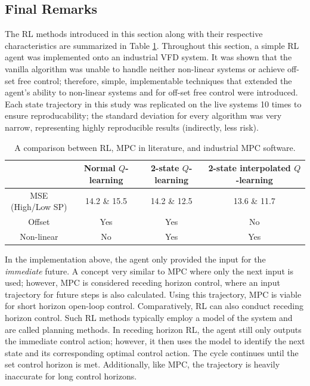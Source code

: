 \subsection{Final Remarks}
The RL methods introduced in this section along with their respective characteristics are summarized in Table \ref{tab:system1_info}. Throughout this section, a simple RL agent was implemented onto an industrial VFD system. It was shown that the vanilla algorithm was unable to handle neither non-linear systems or achieve off-set free control; therefore, simple, implementable techniques that extended the agent's ability to non-linear systems and for off-set free control were introduced. Each state trajectory in this study was replicated on the live systems 10 times to ensure reproducability; the standard deviation for every algorithm was very narrow, representing highly reproducible results (indirectly, less risk).

\begin{table}[H]
\caption{A comparison between RL, MPC in literature, and industrial MPC software.}
\label{tab:system1_info}
\centering
{\scriptsize
\begin{tabular}{c|c|c|c}
 & \textbf{Normal $Q$-learning}	& \textbf{2-state $Q$-learning} & \textbf{2-state interpolated $Q$-learning}\\
 \hline
MSE (High/Low SP)   & 14.2 \& 15.5	& 14.2 \& 12.5   &  13.6 \& 11.7 \\
Offset		& Yes			&  Yes   &  No \\
Non-linear		& No			& Yes   &  Yes \\
\end{tabular}}
\end{table}

In the implementation above, the agent only provided the input for the \textit{immediate} future. A concept very similar to MPC where only the next input is used; however, MPC is considered receding horizon control, where an input trajectory for future steps is also calculated.  Using this trajectory, MPC is viable for short horizon open-loop control.  Comparatively, RL can also conduct receding horizon control. Such RL methods typically employ a model of the system and are called planning methods.  In receding horizon RL, the agent still only outputs the immediate control action; however, it then uses the model to identify the next state and its corresponding optimal control action. The cycle continues until the set control horizon is met.  Additionally, like MPC, the trajectory is heavily inaccurate for long control horizons.

